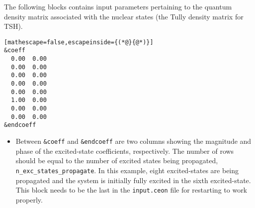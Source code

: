 The following blocks contains input parameters pertaining to the quantum density matrix associated with the nuclear states (the Tully density matrix for TSH).
\begin{lstlisting}[mathescape=false,escapeinside={(*@}{@*)}]
&coeff
  0.00  0.00
  0.00  0.00
  0.00  0.00
  0.00  0.00
  0.00  0.00
  1.00  0.00
  0.00  0.00
  0.00  0.00
&endcoeff
\end{lstlisting}
\begin{itemize} 
\item Between \verb+&coeff+ and \verb+&endcoeff+ are two columns showing the magnitude and phase of the excited-state coefficients, respectively.  The number of rows should be equal to the number of excited states being propagated, \verb+n_exc_states_propagate+.  In this example, eight excited-states are being propagated and the system is initially fully excited in the sixth excited-state. This block needs to be the last in the \verb+input.ceon+ file for restarting to work properly.
\end{itemize}